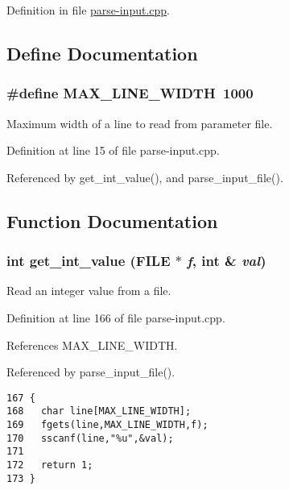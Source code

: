 Definition in file \hyperlink{parse-input_8cpp-source}{parse-input.cpp}.

\subsection{Define Documentation}
\hypertarget{parse-input_8cpp_09f908aa6474fe2b1f82b1aaade947f6}{
\subsubsection[MAX\_\-LINE\_\-WIDTH]{\setlength{\rightskip}{0pt plus 5cm}\#define MAX\_\-LINE\_\-WIDTH~1000}}
\label{parse-input_8cpp_09f908aa6474fe2b1f82b1aaade947f6}


Maximum width of a line to read from parameter file. 



Definition at line 15 of file parse-input.cpp.

Referenced by get\_\-int\_\-value(), and parse\_\-input\_\-file().

\subsection{Function Documentation}
\hypertarget{parse-input_8cpp_84d83813df0dc09fd6a2a4fbfc893d03}{
\subsubsection[get\_\-int\_\-value]{\setlength{\rightskip}{0pt plus 5cm}int get\_\-int\_\-value (FILE $\ast$ {\em f}, int \& {\em val})}}
\label{parse-input_8cpp_84d83813df0dc09fd6a2a4fbfc893d03}


Read an integer value from a file. 



Definition at line 166 of file parse-input.cpp.

References MAX\_\-LINE\_\-WIDTH.

Referenced by parse\_\-input\_\-file().

\begin{Code}\begin{verbatim}167 {
168   char line[MAX_LINE_WIDTH];
169   fgets(line,MAX_LINE_WIDTH,f);
170   sscanf(line,"%u",&val);
171 
172   return 1;
173 }
\end{verbatim}\end{Code}


